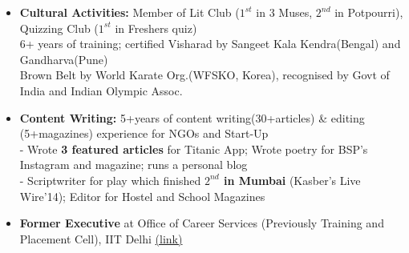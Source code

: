 \documentclass{article}
\begin{document}
\begin{itemize}
    \item \textbf{Cultural Activities:} \underline{} Member of Lit Club ($1^{st}$ in 3 Muses, $2^{nd}$ in Potpourri), Quizzing Club ($1^{st}$ in Freshers quiz)\\
\underline{} 6+ years of training; certified Visharad by Sangeet Kala Kendra(Bengal) and Gandharva(Pune)\\
\underline{} Brown Belt by World Karate Org.(WFSKO, Korea), recognised by Govt of India and Indian Olympic Assoc.

\item \textbf{Content Writing:} 5+years of content writing(30+articles) \& editing (5+magazines) experience for NGOs and Start-Up\\
- Wrote \textbf{3 featured articles} for Titanic App; Wrote poetry for BSP's Instagram and magazine; runs a personal blog\\
- Scriptwriter for play which finished \textbf{$2^{nd}$ in Mumbai} (Kasber's Live Wire'14); Editor for Hostel and School Magazines
    
    \item \textbf{Former Executive} at Office of Career Services (Previously Training and Placement Cell), IIT Delhi \href{https://tnp.iitd.ac.in/newtnp/}{(link)}
     
\end{itemize}





\end{document}

